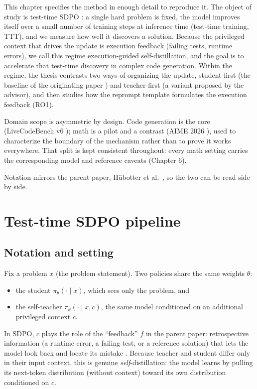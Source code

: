 \documentclass[12pt,a4paper]{report}
\providecommand{\tightlist}{\setlength{\itemsep}{0pt}\setlength{\parskip}{0pt}}
\begin{document}
This chapter specifies the method in enough detail to reproduce it. The object of study is test-time SDPO \cite{r1}: a single hard problem is fixed, the model improves itself over a small number of training steps at inference time (test-time training, TTT), and we measure how well it discovers a solution. Because the privileged context that drives the update is execution feedback (failing tests, runtime errors), we call this regime execution-guided self-distillation, and the goal is to accelerate that test-time discovery in complex code generation. Within the regime, the thesis contrasts two ways of organizing the update, student-first (the baseline of the originating paper \cite{r1}) and teacher-first (a variant proposed by the advisor), and then studies how the reprompt template formulates the execution feedback (RO1).

Domain scope is asymmetric by design. Code generation is the core (LiveCodeBench v6 \cite{r6}); math is a pilot and a contrast (AIME 2026 \cite{r10}), used to characterize the boundary of the mechanism rather than to prove it works everywhere. That split is kept consistent throughout: every math setting carries the corresponding model and reference caveats (Chapter 6).

Notation mirrors the parent paper, Hübotter et al.~\cite{r1}, so the two can be read side by side.

\section{Test-time SDPO pipeline}\label{test-time-sdpo-pipeline}

\subsection{Notation and setting}\label{notation-and-setting}

Fix a problem \(x\) (the problem statement). Two policies share the same weights \(\theta\):

\begin{itemize}
\tightlist
\item
  the student \(\pi_\theta(\cdot \mid x)\), which sees only the problem, and
\item
  the self-teacher \(\pi_\theta(\cdot \mid x, c)\), the same model conditioned on an additional privileged context \(c\).
\end{itemize}

In SDPO, \(c\) plays the role of the ``feedback'' \(f\) in the parent paper: retrospective information (a runtime error, a failing test, or a reference solution) that lets the model look back and locate its mistake \cite{r1}. Because teacher and student differ only in their input context, this is genuine \emph{self}-distillation: the model learns by pulling its next-token distribution (without context) toward its own distribution conditioned on \(c\).
\end{document}
